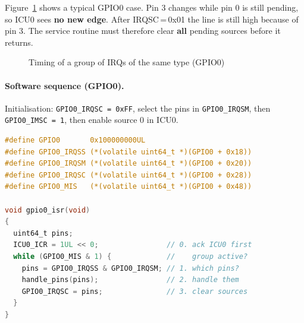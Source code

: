 Figure~\ref{fig:archirq05} shows a typical GPIO0 case. Pin 3 changes while
pin 0 is still pending, so ICU0 sees \textbf{no new edge}. After
IRQSC\,=\,0x01 the line is still high because of pin 3. The service routine
must therefore clear \textbf{all} pending sources before it returns.

\begin{figure}[H]
\centering
{}
\caption{Timing of a group of IRQs of the same type (GPIO0)}
\label{fig:archirq05}
\end{figure}

\paragraph{Software sequence (GPIO0).}
Initialisation: \texttt{GPIO0\_IRQSC\,=\,0xFF}, select the pins in
\texttt{GPIO0\_IRQSM}, then \texttt{GPIO0\_IMSC\,=\,1}, then enable source 0
in ICU0.
\begin{lstlisting}[basicstyle=\ttfamily\scriptsize,language=C]
#define GPIO0       0x100000000UL
#define GPIO0_IRQSS (*(volatile uint64_t *)(GPIO0 + 0x18))
#define GPIO0_IRQSM (*(volatile uint64_t *)(GPIO0 + 0x20))
#define GPIO0_IRQSC (*(volatile uint64_t *)(GPIO0 + 0x28))
#define GPIO0_MIS   (*(volatile uint64_t *)(GPIO0 + 0x48))

void gpio0_isr(void)
{
  uint64_t pins;
  ICU0_ICR = 1UL << 0;                // 0. ack ICU0 first
  while (GPIO0_MIS & 1) {             //    group active?
    pins = GPIO0_IRQSS & GPIO0_IRQSM; // 1. which pins?
    handle_pins(pins);                // 2. handle them
    GPIO0_IRQSC = pins;               // 3. clear sources
  }
}
\end{lstlisting}

